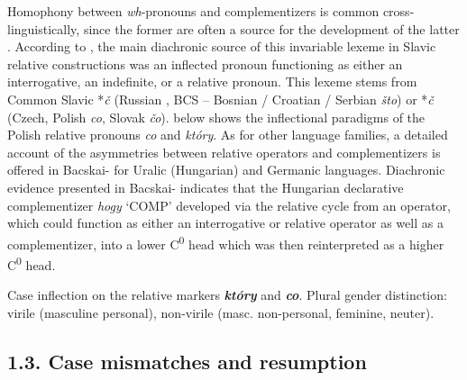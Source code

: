 \documentclass[output=paper]{langsci/langscibook}
\begin{document}
Homophony between \textit{wh}{}-pronouns and complementizers is common cross-linguistically, since the former are often a source for the development of the latter \citep[108]{Citko2004}. According to \citet{Minlos2012}, the main diachronic source of this invariable lexeme in Slavic relative constructions was an inflected pronoun functioning as either an interrogative, an indefinite, or a relative pronoun. This lexeme stems from Common Slavic *\textit{č }(Russian \textit{}, BCS – Bosnian / Croatian / Serbian \textit{što}) or *\textit{č }(Czech, Polish \textit{co}, Slovak \textit{čo}).  below shows the inflectional paradigms of the Polish relative pronouns \textit{co} and \textit{który}. As for other language families, a detailed account of the asymmetries between relative operators and complementizers is offered in Bacskai-\citet{Atkari2016} for Uralic (Hungarian) and Germanic languages. Diachronic evidence presented in Bacskai-\citet{Atkari2016} indicates that the Hungarian declarative complementizer \textit{hogy} ‘COMP’ developed via the relative cycle from an operator, which could function as either an interrogative or relative operator as well as a complementizer, into a lower C\textsuperscript{0} head which was then reinterpreted as a higher C\textsuperscript{0} head. 

\begin{table}
\caption{Case inflection on the relative markers \textbf{\textit{który}} and \textbf{\textit{co}}. Plural gender distinction: virile (masculine personal), non-virile (masc. non-personal, feminine, neuter).}
\label{tab:1}
\end{table}

\begin{styleListParagraph}
  
 
\end{styleListParagraph}

\subsection{ 1.3. Case mismatches and resumption}
\end{document}
